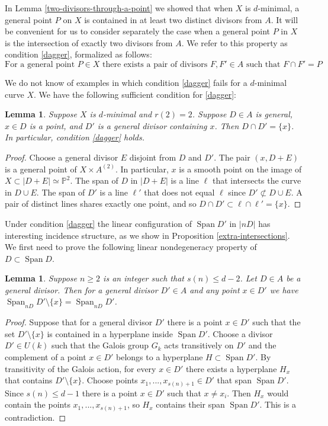 \documentclass[11pt]{amsart}
\newcommand{\pp}{\mathbb{P}}
\newcommand{\Span}{\operatorname{Span}}
\newtheorem{lemma}[theorem]{Lemma}
\theoremstyle{definition}
\theoremstyle{remark}
\begin{document}
In Lemma \ref{two-divisors-through-a-point} we showed that when \(X\) is \(d\)-minimal, a general point $P$ on $X$ is contained in at least two distinct divisors from $A$. It will be convenient for us to consider separately the case when a general point $P$ in $X$ is the intersection of exactly two divisors from $A$. We refer to this property as condition \eqref{dagger}, formalized as follows:
\begin{equation}\tag{$\dagger$}\label{dagger}
\text{For a general point }P \in X\text{ there exists  a pair of divisors } F, F' \in A \text{ such that } F \cap F'=P
\end{equation}

We do not know of examples in which condition \eqref{dagger} fails for a $d$-minimal curve $X$. We have the following sufficient condition for \eqref{dagger}:

\begin{lemma}\label{lemma:two_divisors_one_point}
Suppose $X$ is $d$-minimal and $r(2)=2$. Suppose $D\in A$ is general, $x \in D$ is a point, and $D'$ is a general divisor containing $x$. Then $D \cap D' = \{x\}$. In particular, condition \eqref{dagger} holds.
\end{lemma}
\begin{proof}
Choose a general divisor $E$ disjoint from $D$ and $D'$. The pair \((x, D + E)\) is a general point of \(X \times A^{(2)}\).  In particular, \(x\) is a smooth point on the image of \(X \subset |D+E|\simeq \pp^2\).  The span of $D$ in $|D+E|$ is a line $\ell$ that intersects the curve in $D \cup E$. The span of $D'$ is a line $\ell'$ that does not equal $\ell$ since $D' \not\subset D \cup E$. A pair of distinct lines shares exactly one point, and so $D \cap D' \subset \ell \cap \ell' = \{x\}.$
\end{proof}
Under condition \eqref{dagger} the linear configuration of $\Span D'$ in $|nD|$ has interesting incidence structure, as we show in Proposition \ref{extra-intersections}. We first need to prove the following linear nondegeneracy property of $D \subset \Span D$. 
\begin{lemma}\label{transitive-monodromy}
Suppose $n \geqslant 2$ is an integer such that $s(n) \leqslant d-2$. Let $D \in A$ be a general divisor. Then for a general divisor $D' \in A$ and any point $x \in D'$ we have $\Span_{nD} D'\setminus\{x\}=\Span_{nD} D'$. 
\end{lemma}
\begin{proof}
Suppose that for a general divisor $D'$ there is a point $x \in D'$ such that the set $D' \setminus \{x\}$ is contained in a hyperplane inside $\Span D'$. Choose a divisor $D' \in U(k)$ such that the Galois group $G_k$ acts transitively on $D'$ and the complement of a point $x \in D'$ belongs to a hyperplane $H \subset \Span D'$. By transitivity of the Galois action, for every $x \in D'$ there exists a hyperplane $H_x$ that contains $D' \setminus \{x\}$. Choose points $x_1, ..., x_{s(n)+1} \in D'$ that span $\Span D'$.  Since $s(n) \leqslant d-1$ there is a point $x \in D'$ such that $x \neq x_i$. Then $H_x$ would contain the points $x_1, ..., x_{s(n)+1}$, so $H_x$ contains their span $\Span D'$. This is a contradiction.  
\end{proof}
\end{document}
